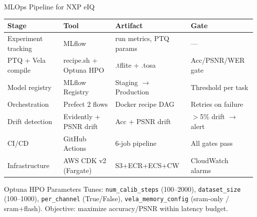 \documentclass[aspectratio=169]{beamer}
\begin{document}
\begin{frame}{MLOps Pipeline for NXP eIQ}
\small
\begin{tabular}{llll}
\toprule
\textbf{Stage} & \textbf{Tool} & \textbf{Artifact} & \textbf{Gate}\\
\midrule
Experiment tracking & MLflow & run metrics, PTQ params & ---\\
PTQ + Vela compile & recipe.sh + Optuna HPO & .tflite + .tosa & Acc/PSNR/WER gate\\
Model registry & MLflow Registry & Staging $\rightarrow$ Production & Threshold per task\\
Orchestration & Prefect 2 flows & Docker recipe DAG & Retries on failure\\
Drift detection & Evidently + PSNR drift & Acc + PSNR drift & $>$5\% drift $\rightarrow$ alert\\
CI/CD & GitHub Actions & 6-job pipeline & All gates pass\\
Infrastructure & AWS CDK v2 (Fargate) & S3+ECR+ECS+CW & CloudWatch alarms\\
\bottomrule
\end{tabular}
\vspace{0.3cm}
\begin{block}{Optuna HPO Parameters}
\footnotesize Tunes: \texttt{num\_calib\_steps} (100--2000), \texttt{dataset\_size} (100--1000), \texttt{per\_channel} (True/False), \texttt{vela\_memory\_config} (sram-only / sram+flash). Objective: maximize accuracy/PSNR within latency budget.
\end{block}
\end{frame}
\end{document}
